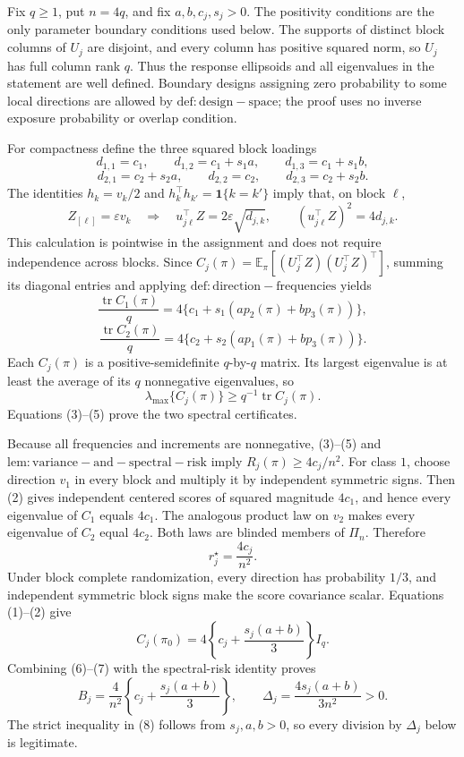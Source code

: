 Fix \(q\ge 1\), put \(n=4q\), and fix \(a,b,c_j,s_j>0\). The positivity conditions are the only parameter boundary conditions used below. The supports of distinct block columns of \(U_j\) are disjoint, and every column has positive squared norm, so \(U_j\) has full column rank \(q\). Thus the response ellipsoids and all eigenvalues in the statement are well defined. Boundary designs assigning zero probability to some local directions are allowed by \(\mathrm{def:design-space}\); the proof uses no inverse exposure probability or overlap condition.

For compactness define the three squared block loadings
\[
d_{1,1}=c_1,\qquad d_{1,2}=c_1+s_1a,\qquad d_{1,3}=c_1+s_1b,
\]
\[
d_{2,1}=c_2+s_2a,\qquad d_{2,2}=c_2,\qquad d_{2,3}=c_2+s_2b. \tag{1}
\]
The identities \(h_k=v_k/2\) and \(h_k^\top h_{k'}=\mathbf 1\{k=k'\}\) imply that, on block \(\ell\),
\[
Z_{[\ell]}=\varepsilon v_k
\quad\Longrightarrow\quad
u_{j\ell}^\top Z=2\varepsilon\sqrt{d_{j,k}},
\qquad
(u_{j\ell}^\top Z)^2=4d_{j,k}. \tag{2}
\]
This calculation is pointwise in the assignment and does not require independence across blocks. Since \(C_j(\pi)=\mathbb E_\pi[(U_j^\top Z)(U_j^\top Z)^\top]\), summing its diagonal entries and applying \(\mathrm{def:direction-frequencies}\) yields
\[
\frac{\operatorname{tr}C_1(\pi)}q
=4\{c_1+s_1(ap_2(\pi)+bp_3(\pi))\}, \tag{3}
\]
\[
\frac{\operatorname{tr}C_2(\pi)}q
=4\{c_2+s_2(ap_1(\pi)+bp_3(\pi))\}. \tag{4}
\]
Each \(C_j(\pi)\) is a positive-semidefinite \(q\)-by-\(q\) matrix. Its largest eigenvalue is at least the average of its \(q\) nonnegative eigenvalues, so
\[
\lambda_{\max}\{C_j(\pi)\}\ge q^{-1}\operatorname{tr}C_j(\pi). \tag{5}
\]
Equations (3)--(5) prove the two spectral certificates.

Because all frequencies and increments are nonnegative, (3)--(5) and \(\mathrm{lem:variance-and-spectral-risk}\) imply \(R_j(\pi)\ge 4c_j/n^2\). For class \(1\), choose direction \(v_1\) in every block and multiply it by independent symmetric signs. Then (2) gives independent centered scores of squared magnitude \(4c_1\), and hence every eigenvalue of \(C_1\) equals \(4c_1\). The analogous product law on \(v_2\) makes every eigenvalue of \(C_2\) equal \(4c_2\). Both laws are blinded members of \(\Pi_n\). Therefore
\[
r_j^\star=\frac{4c_j}{n^2}. \tag{6}
\]
Under block complete randomization, every direction has probability \(1/3\), and independent symmetric block signs make the score covariance scalar. Equations (1)--(2) give
\[
C_j(\pi_0)=4\left\{c_j+\frac{s_j(a+b)}3\right\}I_q. \tag{7}
\]
Combining (6)--(7) with the spectral-risk identity proves
\[
B_j=\frac4{n^2}\left\{c_j+\frac{s_j(a+b)}3\right\},
\qquad
\Delta_j=\frac{4s_j(a+b)}{3n^2}>0. \tag{8}
\]
The strict inequality in (8) follows from \(s_j,a,b>0\), so every division by \(\Delta_j\) below is legitimate.

